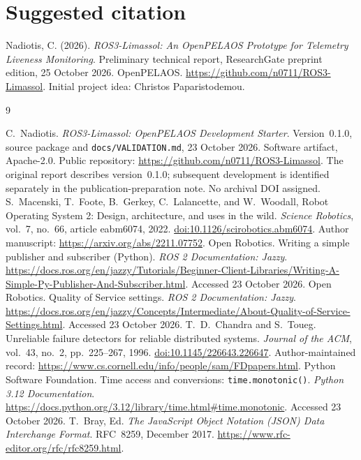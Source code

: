 \documentclass[11pt,a4paper]{article}
\newcommand{\code}[1]{\texttt{#1}}
\begin{document}
\section*{Suggested citation}
Nadiotis, C. (2026).
\emph{ROS3-Limassol: An OpenPELAOS Prototype for Telemetry Liveness Monitoring}.
Preliminary technical report, ResearchGate preprint edition, 25 October 2026.
OpenPELAOS. \url{https://github.com/n0711/ROS3-Limassol}.
Initial project idea: Christos Paparistodemou.

\clearpage
\begin{thebibliography}{9}\small\raggedright
{}
\setlength{\itemsep}{3pt}
C.~Nadiotis. \emph{ROS3-Limassol: OpenPELAOS Development Starter}.
Version~0.1.0, source package and \code{docs/VALIDATION.md}, 23 October 2026.
Software artifact, Apache-2.0. Public repository:
\url{https://github.com/n0711/ROS3-Limassol}.
The original report describes version~0.1.0; subsequent development is identified
separately in the publication-preparation note. No archival DOI assigned.
S.~Macenski, T.~Foote, B.~Gerkey, C.~Lalancette, and W.~Woodall,
Robot Operating System 2: Design, architecture, and uses in the wild.
\emph{Science Robotics}, vol.~7, no.~66, article eabm6074, 2022.
\href{https://doi.org/10.1126/scirobotics.abm6074}{doi:10.1126/scirobotics.abm6074}.
Author manuscript: \url{https://arxiv.org/abs/2211.07752}.
Open Robotics. Writing a simple publisher and subscriber (Python).
\emph{ROS 2 Documentation: Jazzy}.
\url{https://docs.ros.org/en/jazzy/Tutorials/Beginner-Client-Libraries/Writing-A-Simple-Py-Publisher-And-Subscriber.html}.
Accessed 23 October 2026.
Open Robotics. Quality of Service settings. \emph{ROS 2 Documentation: Jazzy}.
\url{https://docs.ros.org/en/jazzy/Concepts/Intermediate/About-Quality-of-Service-Settings.html}.
Accessed 23 October 2026.
T.~D.~Chandra and S.~Toueg. Unreliable failure detectors for reliable distributed
systems. \emph{Journal of the ACM}, vol.~43, no.~2, pp.~225--267, 1996.
\href{https://doi.org/10.1145/226643.226647}{doi:10.1145/226643.226647}.
Author-maintained record: \url{https://www.cs.cornell.edu/info/people/sam/FDpapers.html}.
Python Software Foundation. Time access and conversions:
\code{time.monotonic()}. \emph{Python 3.12 Documentation}.
\url{https://docs.python.org/3.12/library/time.html#time.monotonic}.
Accessed 23 October 2026.
T.~Bray, Ed. \emph{The JavaScript Object Notation (JSON) Data Interchange Format}.
RFC~8259, December 2017.
\url{https://www.rfc-editor.org/rfc/rfc8259.html}.
\end{thebibliography}
\end{document}
